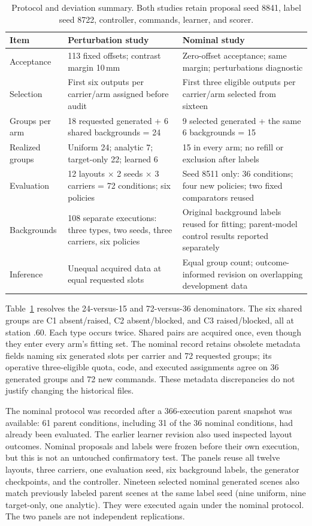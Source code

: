 \documentclass[letterpaper,10pt,conference]{ieeeconf}
\begin{document}
\begin{table}[t]
\centering\small
\caption{Protocol and deviation summary. Both studies retain proposal seed 8841,
label seed 8722, controller, commands, learner, and scorer.}
\begin{tabular}{p{}p{}p{}}
\toprule
Item & Perturbation study & Nominal study\\
\midrule
Acceptance & 113 fixed offsets; contrast margin 10\,mm & Zero-offset acceptance; same margin; perturbations diagnostic\\
Selection & First six outputs per carrier/arm assigned before audit & First three eligible outputs per carrier/arm selected from sixteen\\
Groups per arm & 18 requested generated + 6 shared backgrounds = 24 & 9 selected generated + the same 6 backgrounds = 15\\
Realized groups & Uniform 24; analytic 7; target-only 22; learned 6 & 15 in every arm; no refill or exclusion after labels\\
Evaluation & 12 layouts $\times$ 2 seeds $\times$ 3 carriers = 72 conditions; six policies & Seed 8511 only: 36 conditions; four new policies; two fixed comparators reused\\
Backgrounds & 108 separate executions: three types, two seeds, three carriers, six policies & Original background labels reused for fitting; parent-model control results reported separately\\
Inference & Unequal acquired data at equal requested slots & Equal group count; outcome-informed revision on overlapping development data\\
\bottomrule
\end{tabular}
\label{tab:protocol}
\end{table}

Table~\ref{tab:protocol} resolves the 24-versus-15 and 72-versus-36 denominators.
The six shared groups are C1 absent/raised, C2 absent/blocked, and C3
raised/blocked, all at station .60. Each type occurs twice. Shared pairs are
acquired once, even though they enter every arm's fitting set. The nominal
record retains obsolete metadata fields naming six generated slots per
carrier and 72 requested groups; its operative three-eligible quota, code,
and executed assignments agree on 36 generated groups and 72 new commands.
These metadata discrepancies do not justify changing the historical files.

The nominal protocol was recorded after a 366-execution parent snapshot was
available: 61 parent conditions, including 31 of the 36 nominal conditions,
had already been evaluated. The earlier learner revision also used inspected
layout outcomes. Nominal proposals and labels were frozen before their own
execution, but this is not an untouched confirmatory test. The panels reuse
all twelve layouts, three carriers, one evaluation seed, six background labels,
the generator checkpoints, and the controller. Nineteen selected nominal
generated scenes also match previously labeled parent scenes at the same
label seed (nine uniform, nine target-only, one analytic). They were executed
again under the nominal protocol. The two panels are not independent replications.
\end{document}
